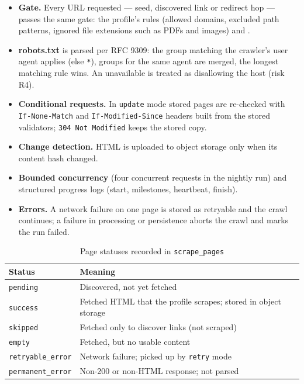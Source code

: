 \documentclass[11pt,letterpaper]{report}
\begin{document}
\begin{itemize}
  \item \textbf{Gate.} Every URL requested --- seed, discovered link or redirect hop --- passes the same
        gate: the profile's rules (allowed domains, excluded path patterns, ignored file extensions
        such as PDFs and images) and .
  \item \textbf{robots.txt} is parsed per RFC 9309: the group matching the crawler's user agent applies
        (else \texttt{*}), groups for the same agent are merged, the longest matching rule wins.
        An unavailable  is treated as disallowing the host (risk R4).
  \item \textbf{Conditional requests.} In \texttt{update} mode stored pages are re-checked with
        \texttt{If-None-Match} and \texttt{If-Modified-Since} headers built from the stored validators;
        \texttt{304 Not Modified} keeps the stored copy.
  \item \textbf{Change detection.} HTML is uploaded to object storage only when its content hash changed.
  \item \textbf{Bounded concurrency} (four concurrent requests in the nightly run) and structured progress
        logs (start, milestones, heartbeat, finish).
  \item \textbf{Errors.} A network failure on one page is stored as retryable and the crawl continues; a
        failure in processing or persistence aborts the crawl and marks the run failed.
\end{itemize}

\begin{table}[H]
\centering
\caption{Page statuses recorded in \texttt{scrape\_pages}}\label{tab:scrapestatus}
\begin{tabularx}{\textwidth}{@{}P{3.4cm}L@{}}
\toprule
\textbf{Status} & \textbf{Meaning} \\
\midrule
\texttt{pending} & Discovered, not yet fetched \\
\texttt{success} & Fetched HTML that the profile scrapes; stored in object storage \\
\texttt{skipped} & Fetched only to discover links (not scraped) \\
\texttt{empty} & Fetched, but no usable content \\
\texttt{retryable\_error} & Network failure; picked up by \texttt{retry} mode \\
\texttt{permanent\_error} & Non-200 or non-HTML response; not parsed \\
\bottomrule
\end{tabularx}
\end{table}
\end{document}
